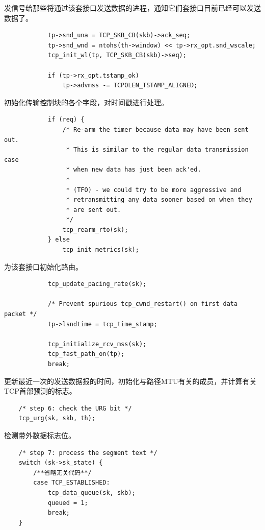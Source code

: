                     发信号给那些将通过该套接口发送数据的进程，通知它们套接口目前已经可以发送数据了。

\begin{verbatim}
            tp->snd_una = TCP_SKB_CB(skb)->ack_seq;
            tp->snd_wnd = ntohs(th->window) << tp->rx_opt.snd_wscale;
            tcp_init_wl(tp, TCP_SKB_CB(skb)->seq);

            if (tp->rx_opt.tstamp_ok)
                tp->advmss -= TCPOLEN_TSTAMP_ALIGNED;
\end{verbatim}

                    初始化传输控制块的各个字段，对时间戳进行处理。

\begin{verbatim}
            if (req) {
                /* Re-arm the timer because data may have been sent out.
                 * This is similar to the regular data transmission case
                 * when new data has just been ack'ed.
                 *
                 * (TFO) - we could try to be more aggressive and
                 * retransmitting any data sooner based on when they
                 * are sent out.
                 */
                tcp_rearm_rto(sk);
            } else
                tcp_init_metrics(sk);
\end{verbatim}

                    为该套接口初始化路由。

\begin{verbatim}
            tcp_update_pacing_rate(sk);

            /* Prevent spurious tcp_cwnd_restart() on first data packet */
            tp->lsndtime = tcp_time_stamp;

            tcp_initialize_rcv_mss(sk);
            tcp_fast_path_on(tp);
            break;
\end{verbatim}

                更新最近一次的发送数据报的时间，初始化与路径MTU有关的成员，并计算有关TCP首部预测的标志。

\begin{verbatim}
    /* step 6: check the URG bit */
    tcp_urg(sk, skb, th);
\end{verbatim}

                检测带外数据标志位。

\begin{verbatim}
    /* step 7: process the segment text */
    switch (sk->sk_state) {
        /**省略无关代码**/
        case TCP_ESTABLISHED:
            tcp_data_queue(sk, skb);
            queued = 1;
            break;
    }
\end{verbatim}

